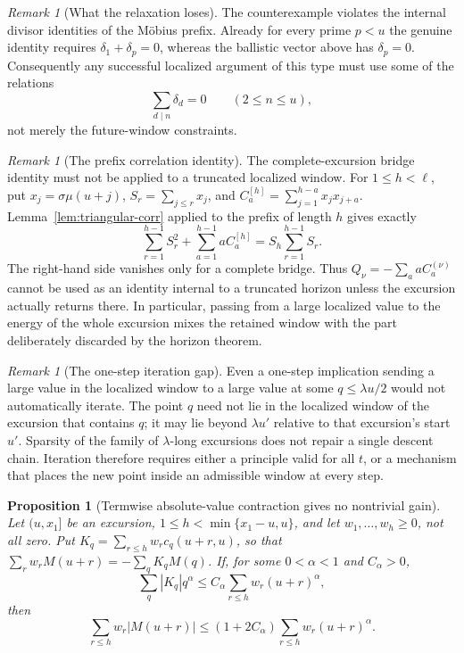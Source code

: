 \documentclass[11pt]{amsart}
\numberwithin{equation}{section}
\theoremstyle{plain}
\newtheorem{proposition}[theorem]{Proposition}
\theoremstyle{definition}
\theoremstyle{remark}
\newtheorem{remark}[theorem]{Remark}
\begin{document}
\begin{remark}[What the relaxation loses]
\label{rem:relaxed-loses}
The counterexample violates the internal divisor identities of the M\"obius
prefix.  Already for every prime $p<u$ the genuine identity requires
$\delta_1+\delta_p=0$, whereas the ballistic vector above has
$\delta_p=0$.  Consequently any successful localized argument of this type
must use some of the relations
\[
\sum_{d\mid n}\delta_d=0\qquad(2\le n\le u),
\]
not merely the future-window constraints.
\end{remark}

\begin{remark}[The prefix correlation identity]
\label{rem:prefix-correlation}
The complete-excursion bridge identity must not be applied to a truncated
localized window.  For $1\le h<\ell$, put
$x_j=\sigma\mu(u+j)$,
$S_r=\sum_{j\le r}x_j$, and
$C_a^{[h]}=\sum_{j=1}^{h-a}x_jx_{j+a}$.  Lemma~\ref{lem:triangular-corr}
applied to the prefix of length $h$ gives exactly
\[
\sum_{r=1}^{h-1}S_r^2+\sum_{a=1}^{h-1}aC_a^{[h]}
=S_h\sum_{r=1}^{h-1}S_r.
\]
The right-hand side vanishes only for a complete bridge.  Thus
$Q_\nu=-\sum_a aC_a^{(\nu)}$ cannot be used as an identity internal to a
truncated horizon unless the excursion actually returns there.  In
particular, passing from a large localized value to the energy of the whole
excursion mixes the retained window with the part deliberately discarded by
the horizon theorem.
\end{remark}

\begin{remark}[The one-step iteration gap]
\label{rem:iteration-gap}
Even a one-step implication sending a large value in the localized window
to a large value at some $q\le\lambda u/2$ would not automatically iterate.
The point $q$ need not lie in the localized window of the excursion that
contains $q$; it may lie beyond $\lambda u'$ relative to that excursion's
start $u'$.  Sparsity of the family of $\lambda$-long excursions does not
repair a single descent chain.  Iteration therefore requires either a
principle valid for all $t$, or a mechanism that places the new point inside
an admissible window at every step.
\end{remark}

\begin{proposition}[Termwise absolute-value contraction gives no nontrivial gain]
\label{prop:cone-obstruction}
Let $(u,x_1]$ be an excursion, $1\le h<\min\{x_1-u,u\}$, and let
$w_1,\dots,w_h\ge0$, not all zero. Put
$K_q=\sum_{r\le h}w_rc_q(u+r,u)$, so that
$\sum_rw_rM(u+r)=-\sum_qK_qM(q)$. If, for some $0<\alpha<1$ and
$C_\alpha>0$,
\[
\sum_q|K_q|q^\alpha\le C_\alpha\sum_{r\le h}w_r(u+r)^\alpha,
\]
then
\[
\sum_{r\le h}w_r|M(u+r)|
\le(1+2C_\alpha)\sum_{r\le h}w_r(u+r)^\alpha.
\]
\end{proposition}
\end{document}
